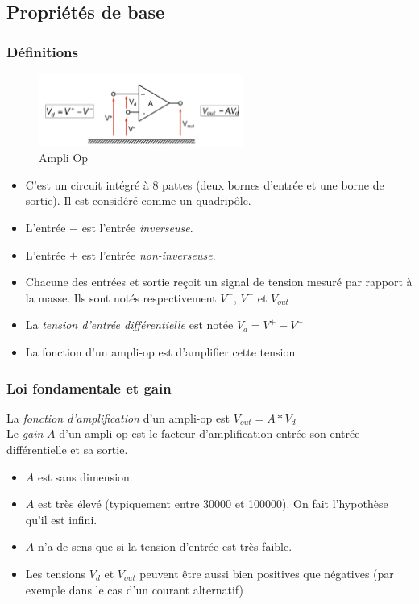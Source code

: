 \documentclass[a4paper]{article}
\begin{document}
    \subsection{Propriétés de base}
        \subsubsection{Définitions}
            \begin{figure}[H]
                \begin{center}
                    \includegraphics[width=0.6\textwidth]{fig/4_ampliop.png}
                    \caption{Ampli Op}
                \end{center}
            \end{figure}
            \begin{itemize} 
            \item C'est un circuit intégré à 8 pattes (deux bornes d'entrée et une borne de sortie). Il est considéré comme un quadripôle.
            \item L'entrée $-$ est l'entrée \textit{inverseuse}.
            \item L'entrée $+$ est l'entrée \textit{non-inverseuse}.
            \item Chacune des entrées et sortie reçoit un signal de tension mesuré par rapport à la masse. Ils sont notés respectivement $ V^{+} $, $ V^{-} $ et $ V_{out} $
            \item La \textit{tension d'entrée différentielle} est notée $ V_{d} = V^{+} - V^{-} $
            \item La fonction d'un ampli-op est d'amplifier cette tension
            \end{itemize}
        \subsubsection{Loi fondamentale et gain}
        La \textit{fonction d'amplification} d'un ampli-op est $ V_{out} = A*V_{d} $ \\
        Le \textit{gain} $A$ d'un ampli op est le facteur d'amplification entrée son entrée différentielle et sa sortie. \\
        \begin{itemize}
            \item $A$ est sans dimension.
            \item $A$ est très élevé (typiquement entre 30000 et 100000). On fait l'hypothèse qu'il est infini.
            \item $A$ n'a de sens que si la tension d'entrée est très faible.
            \item Les tensions $V_{d}$ et $V_{out}$ peuvent être aussi bien positives que négatives (par exemple dans le cas d'un courant alternatif)
        \end{itemize}
\end{document}
